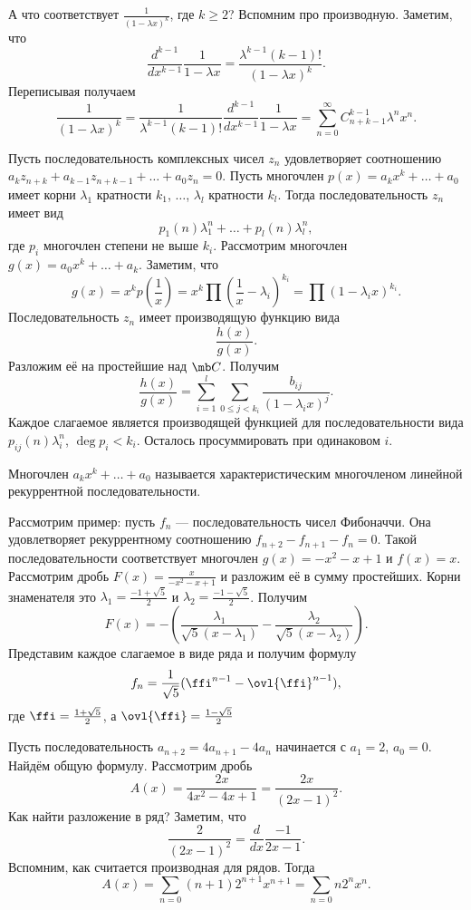 А что соответствует ${\frac{1}{(1-\lambda x)^k}}$, где $k\geq 2$? Вспомним про производную. Заметим, что $$\frac{d^{k-1}}{dx^{k-1}}\frac{1}{1-\lambda x}=\frac{\lambda^{k-1} (k-1)!}{(1-\lambda x)^k}.$$
Переписывая получаем
$$\frac{1}{(1-\lambda x)^k}= \frac{1}{\lambda^{k-1} (k-1)!}\frac{d^{k-1}}{dx^{k-1}}\frac{1}{1-\lambda x}=  \sum_{n=0}^{\infty} C_{n+k-1}^{k-1} \lambda^{n}x^{n}.$$

\crl Пусть последовательность комплексных чисел $z_n$ удовлетворяет соотношению $a_k z_{n+k}+a_{k-1}z_{n+k-1}+\dots+a_0z_n=0$. Пусть многочлен $p(x)=a_k x^k+\dots +a_0$ имеет корни $\lambda_1$ кратности $k_1$, $\ldots$, $\lambda_l$ кратности $k_l$. Тогда последовательность $z_n$ имеет вид
$$ p_1(n)\lambda_1^n+\dots+p_l(n)\lambda_l^n,$$
где $p_i$ многочлен степени не выше $k_i$.
\proof
Рассмотрим многочлен $g(x)=a_0x^k+\dots+a_k$. Заметим, что $$g(x)=x^k p\left(\frac{1}{x}\right)= x^k\prod\left(\frac{1}{x}-\lambda_i\right)^{k_i}= \prod (1-\lambda_ix)^{k_i}.$$
Последовательность $z_n$ имеет производящую функцию вида
$$\frac{h(x)}{g(x)}.$$
Разложим её на простейшие над $\mb C$. Получим
$$\frac{h(x)}{g(x)}=\sum_{i=1}^l \sum_{0\leq j < k_i} \frac{b_{ij}}{(1-\lambda_ix)^j}.$$
Каждое слагаемое является производящей функцией для последовательности вида $p_{ij}(n)\lambda_i^n$, $\deg p_i < k_i$. Осталось просуммировать при одинаковом $i$.
\endproof
\ecrl

\dfn Многочлен $a_kx^k+\dots +a_0$ называется характеристическим многочленом линейной рекуррентной последовательности.
\edfn

Рассмотрим пример: пусть $f_n$ --- последовательность чисел Фибоначчи. Она удовлетворяет рекуррентному соотношению $f_{n+2}-f_{n+1}-f_n=0.$ Такой последовательности соответствует многочлен $g(x)=-x^2-x+1$ и $f(x)=x$. Рассмотрим дробь $F(x)=\frac{x}{-x^2-x+1}$  и разложим её в сумму простейших. Корни знаменателя это $\lambda_1=\frac{-1+\sqrt{5}}{2}$ и $\lambda_2=\frac{-1-\sqrt{5}}{2}$. Получим
$$F(x)= -\left(\frac{\lambda_1}{\sqrt{5}(x-\lambda_1)}-\frac{\lambda_2}{\sqrt{5}(x-\lambda_2)}\right).$$
Представим каждое слагаемое в виде ряда и получим формулу
$$f_n= \frac{1}{\sqrt{5}}(\ffi^{n-1}-\ovl{\ffi}^{n-1}),$$
где $\ffi=\frac{1+\sqrt{5}}{2}$, а $\ovl{\ffi}=\frac{1-\sqrt{5}}{2}$

Пусть последовательность $a_{n+2}=4a_{n+1}-4a_n$ начинается с $a_1=2$, $a_0=0$. Найдём общую формулу. Рассмотрим дробь $$A(x)=\frac{2x}{4x^2-4x+1}=\frac{2x}{(2x-1)^2}.$$
Как найти разложение в ряд? Заметим, что $$\frac{2}{(2x-1)^2}= \frac{d}{dx}\frac{-1}{2x-1}.$$
Вспомним, как считается производная для рядов. Тогда
$$A(x)=\sum_{n=0} (n+1) 2^{n+1} x^{n+1}=\sum_{n=0} n2^nx^n.$$




